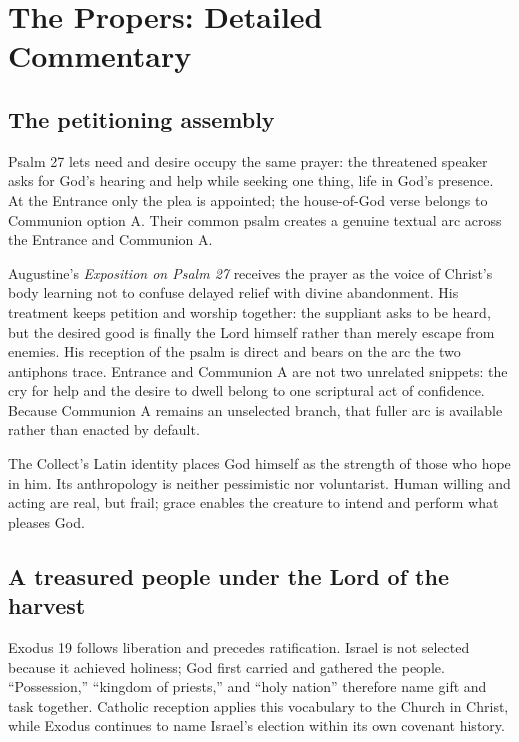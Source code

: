 \section*{The Propers: Detailed Commentary}

\subsection*{The petitioning assembly\enspace{}}

Psalm 27 lets need and desire occupy the same prayer: the threatened speaker asks for God's hearing and help while seeking one thing, life in God's presence. At the Entrance only the plea is appointed; the house-of-God verse belongs to Communion option A. Their common psalm creates a genuine textual arc across the Entrance and Communion A.

Augustine's \emph{Exposition on Psalm 27} receives the prayer as the voice of Christ's body learning not to confuse delayed relief with divine abandonment. His treatment keeps petition and worship together: the suppliant asks to be heard, but the desired good is finally the Lord himself rather than merely escape from enemies. His reception of the psalm is direct and bears on the arc the two antiphons trace. Entrance and Communion A are not two unrelated snippets: the cry for help and the desire to dwell belong to one scriptural act of confidence. Because Communion A remains an unselected branch, that fuller arc is available rather than enacted by default.

The Collect's Latin identity places God himself as the strength of those who hope in him. Its anthropology is neither pessimistic nor voluntarist. Human willing and acting are real, but frail; grace enables the creature to intend and perform what pleases God.

\subsection*{A treasured people under the Lord of the harvest\enspace{}}

Exodus 19 follows liberation and precedes ratification. Israel is not selected because it achieved holiness; God first carried and gathered the people. “Possession,” “kingdom of priests,” and “holy nation” therefore name gift and task together. Catholic reception applies this vocabulary to the Church in Christ, while Exodus continues to name Israel's election within its own covenant history.

